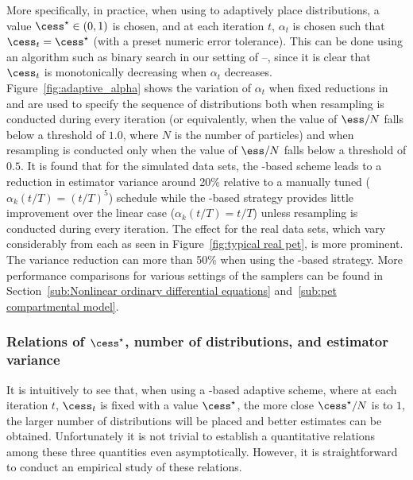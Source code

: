 More specifically, in practice, when using \cess to adaptively place distributions, a value $\cess^\star \in (0, 1)$ is chosen, and at each iteration $t$, $\alpha_t$ is chosen such that $\cess_t = \cess^\star$ (with a preset numeric error tolerance). This can be done using an algorithm such as binary search in our setting of \smc[1]--\smc[3], since it is clear that $\cess_t$ is monotonically decreasing when $\alpha_t$ decreases. Figure~\ref{fig:adaptive_alpha} shows the variation of $\alpha_t$ when fixed reductions in \ess and \cess are used to specify the sequence of distributions both when resampling is conducted during every iteration (or equivalently, when the value of $\ess/N$ falls below a threshold of $1.0$, where $N$ is the number of particles) and when resampling is conducted only when the value of $\ess/N$ falls below a threshold of $0.5$. It is found that for the simulated \pet data sets, the \cess-based scheme leads to a reduction in estimator variance around 20\% relative to a manually tuned ($\alpha_k(t/T) = (t/T)^5$) schedule while the \ess-based strategy provides little improvement over the linear case ($\alpha_k(t/T) = t/T$) unless resampling is conducted during every iteration. The effect for the real data sets, which vary considerably from each as seen in Figure~\ref{fig:typical real pet}, is more prominent. The variance reduction can more than 50\% when using the \cess-based strategy. More performance comparisons for various settings of the samplers can be found in Section~\ref{sub:Nonlinear ordinary differential equations} and~\ref{sub:pet compartmental model}.

\subsubsection[Relations of cess*, number of distributions, and estimator
variance]
{Relations of $\cess^\star$, number of distributions, and estimator variance}
\label{ssub:Relations of cess*, number of distributions, and estimator
  variance}

It is intuitively to see that, when using a \cess-based adaptive scheme, where at each iteration $t$, $\cess_t$ is fixed with a value $\cess^\star$, the more close $\cess^\star/N$ is to $1$, the larger number of distributions will be placed and better estimates can be obtained. Unfortunately it is not trivial to establish a quantitative relations among these three quantities even asymptotically. However, it is straightforward to conduct an empirical study of these relations.

